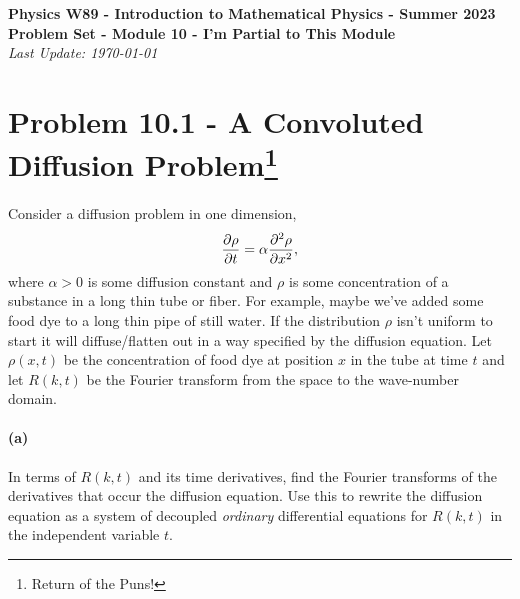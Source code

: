 \documentclass{article}
\begin{document}
\addcopyright
\begin{center}
{\bf \large Physics W89 - Introduction to Mathematical Physics - Summer 2023}\\\medskip
{\bf \large Problem Set - Module 10 - I'm Partial to This Module} \\\medskip
{\emph{Last Update: \today}}
\end{center}


\dphline\bigskip
\section*{Problem 10.1 - A Convoluted Diffusion Problem\footnote{Return of the Puns!}}

\paragraph{}
Consider a diffusion problem in one dimension,
	\begin{equation*}
		\frac{\partial{\rho}}{\partial{t}} = \alpha\frac{\partial^{2}{\rho}}{\partial{x}^{2}},
	\end{equation*}
where $\alpha>0$ is some diffusion constant and $\rho$ is some concentration of a substance in a long thin tube or fiber.  For example, maybe we've added some food
dye to a long thin pipe of still water.  If the distribution $\rho$ isn't uniform to start
it will diffuse/flatten out in a way specified by the diffusion equation.  Let $\rho(x,t)$ be the concentration of food dye at position $x$ in the tube at time $t$ and let
$R(k,t)$ be the Fourier transform from the space to the wave-number domain.

\paragraph{(a)}
In terms of $R(k,t)$ and its time derivatives, find the Fourier transforms of the derivatives that occur the diffusion equation. 
Use this to rewrite the diffusion equation as a system of decoupled 
\emph{ordinary} differential equations for $R(k,t)$ in the independent variable $t$.\\
\end{document}
